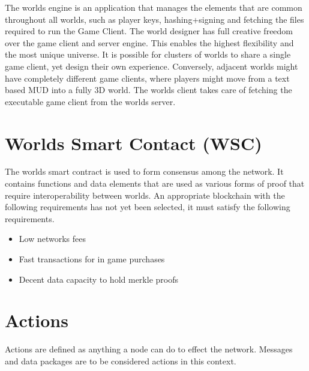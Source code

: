 \documentclass[runningheads,a4paper]{llncs}
\begin{document}
\begin{small}
\begin{center}
\end{center}
\end{small}
The worlds engine is an application that manages the elements that are common throughout all worlds, such as player keys, hashing+signing and fetching the files required to run the Game Client. The world designer has full creative freedom over the game client and server engine. This enables the highest flexibility and the most unique universe. It is possible for clusters of worlds to share a single game client, yet design their own experience. Conversely, adjacent worlds might have completely different game clients, where players might move from a text based MUD into a fully 3D world. The worlds client takes care of fetching the executable game client from the worlds server.

\section{Worlds Smart Contact (WSC)}
\label{WSC}
The worlds smart contract is used to form consensus among the network. It contains functions and data elements that are used as various forms of proof that require interoperability between worlds. An appropriate blockchain with the following requirements has not yet been selected, it must satisfy the following requirements. 

\begin{itemize}
\item{Low networks fees}
\item{Fast transactions for in game purchases}
\item{Decent data capacity to hold merkle proofs}
\end{itemize}

\section{Actions}
Actions are defined as anything a node can do to effect the network. Messages and data packages are to be considered actions in this context.
\end{document}
